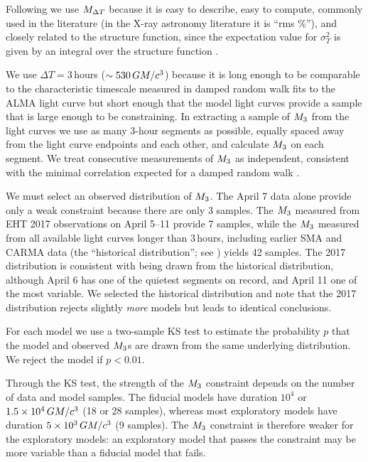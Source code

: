 Following \citet{2015ApJ...812..103C} we use $M_{\Delta T}$ because it is easy to describe, easy to compute, commonly used in the literature (in the X-ray astronomy literature it is ``rms \%''), and closely related to the structure function, since the expectation value for $\sigma_T^2$ is given by an integral over the structure function \citep[see][]{Lee_2022}.

We use $\Delta T = 3$\,hours ($\sim 530\,GM/c^3$) because it is long enough to be comparable to the characteristic timescale measured in damped random walk fits to the ALMA light curve \citep[see Table 10 of][]{Wielgus2022} but short enough that the model light curves provide a sample that is large enough to be constraining.
In extracting a sample of $M_{3}$ from the light curves we use as many 3-hour segments as possible, equally spaced away from the light curve endpoints and each other, and calculate $M_{3}$ on each segment.
We treat consecutive measurements of $M_{3}$ as independent, consistent with the minimal correlation expected for a damped random walk \citep{Lee_2022}.

We must select an observed distribution of $M_{3}$.
The April 7 data alone provide only a weak constraint because there are only 3 samples.
The $M_{3}$ measured from EHT 2017 observations on April 5--11 provide 7 samples, while the $M_{3}$ measured from all available light curves longer than 3\,hours, including earlier SMA and CARMA data (the ``historical distribution''; see \citealt{Wielgus2022}) yields 42 samples.
The 2017 distribution is consistent with being drawn from the historical distribution, although April 6 has one of the quietest segments on record, and April 11 one of the most variable.
We selected the historical distribution and note that the 2017 distribution rejects slightly {\em more} models but leads to identical conclusions.

For each model we use a two-sample KS test to estimate the probability $p$ that the model and observed $M_{3}$s are drawn from the same underlying distribution.
We reject the model if $p < 0.01$.

Through the KS test, the strength of the $M_{3}$ constraint depends on the number of data and model samples.
The fiducial models have duration $10^4$ or $1.5\times 10^4\,GM/c^3$ (18 or 28 samples), whereas most exploratory models have duration $5 \times 10^3\,GM/c^3$ (9 samples).
The $M_{3}$ constraint is therefore weaker for the exploratory models: an exploratory model that passes the constraint may be more variable than a fiducial model that fails.  

